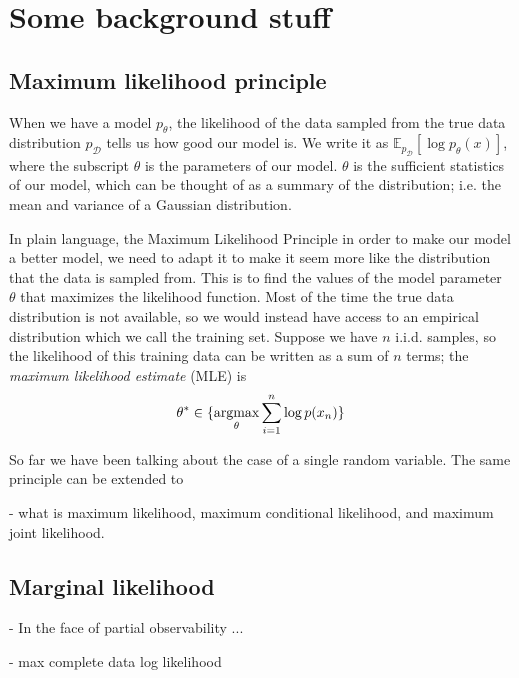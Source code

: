 \documentclass{article}
\newcommand{\D}{\mathcal{D}}
\newcommand{\E}{\mathbb{E}}
\begin{document}


\section{Some background stuff}

\subsection{Maximum likelihood principle}

When we have a model $p_\theta$, the likelihood of the data sampled from the true data distribution $p_\D$ tells us how good our model is. 
We write it as $\E_{p_\D}[\log p_\theta(x)]$, where the subscript $\theta$ is the parameters of our model.
$\theta$ is the sufficient statistics of our model, which can be thought of as a summary of the distribution; i.e. the mean and variance of a Gaussian distribution.

In plain language, the Maximum Likelihood Principle in order to make our model a better model, we need to adapt it to make it seem more like the distribution that the data is sampled from.
This is to find the values of the model parameter $\theta$ that maximizes the likelihood function.
Most of the time the true data distribution is not available, so we would instead have access to an empirical distribution which we call the training set.
Suppose we have $n$ i.i.d. samples, so the likelihood of this training data can be written as a sum of $n$ terms; the \textit{maximum likelihood estimate} (MLE) is 
$$\theta^* \in \{\underset{\theta}{\textnormal{argmax}} \sum_{i=1}^n\log p(x_n)\} $$


So far we have been talking about the case of a single random variable.
The same principle can be extended to 



- what is maximum likelihood, maximum conditional likelihood, and maximum joint likelihood. 

\subsection{Marginal likelihood}

- In the face of partial observability ...

- max complete data log likelihood
\end{document}
